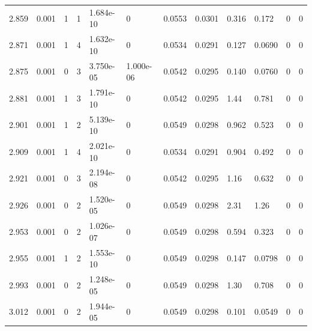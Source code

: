 \documentclass[preview]{standalone}
\begin{document}
{{{{{\begin{tabular}{L{1.2cm}C{1.2cm} C{0.3cm}C{0.5cm} C{1.4cm}C{1.4cm} C{1.4cm}C{1.4cm} C{1.6cm}C{1.6cm} C{1.6cm}C{1.6cm}}
  2.859  &  0.001  & 1     &  1 &  1.684e-10  & 0  &  0.0553&   0.0301& 0.316 & 0.172   &  0 & 0  \\ 
  2.871  &  0.001  & 1     &  4 &  1.632e-10  & 0  &  0.0534&   0.0291& 0.127 & 0.0690   &  0 & 0  \\ 
  2.875  &  0.001  & 0     &  3 &  3.750e-05  & 1.000e-06  &  0.0542&   0.0295& 0.140 & 0.0760   &  0 & 0  \\ 
  2.881  &  0.001  & 1     &  3 &  1.791e-10  & 0  &  0.0542&   0.0295& 1.44 & 0.781   &  0 & 0  \\ 
  2.901  &  0.001  & 1     &  2 &  5.139e-10  & 0  &  0.0549&   0.0298& 0.962 & 0.523   &  0 & 0  \\ 
  2.909  &  0.001  & 1     &  4 &  2.021e-10  & 0  &  0.0534&   0.0291& 0.904 & 0.492   &  0 & 0  \\ 
  2.921  &  0.001  & 0     &  3 &  2.194e-08  & 0  &  0.0542&   0.0295& 1.16 & 0.632   &  0 & 0  \\ 
  2.926  &  0.001  & 0     &  2 &  1.520e-05  & 0  &  0.0549&   0.0298& 2.31 & 1.26   &  0 & 0  \\ 
  2.953  &  0.001  & 0     &  2 &  1.026e-07  & 0  &  0.0549&   0.0298& 0.594 & 0.323   &  0 & 0  \\ 
  2.955  &  0.001  & 1     &  2 &  1.553e-10  & 0  &  0.0549&   0.0298& 0.147 & 0.0798   &  0 & 0  \\ 
  2.993  &  0.001  & 0     &  2 &  1.248e-05  & 0  &  0.0549&   0.0298& 1.30 & 0.708   &  0 & 0  \\ 
  3.012  &  0.001  & 0     &  2 &  1.944e-05  & 0  &  0.0549&   0.0298& 0.101 & 0.0549   &  0 & 0  \\ 
\hline 
\end{tabular} 

}}}}}
\end{document}
